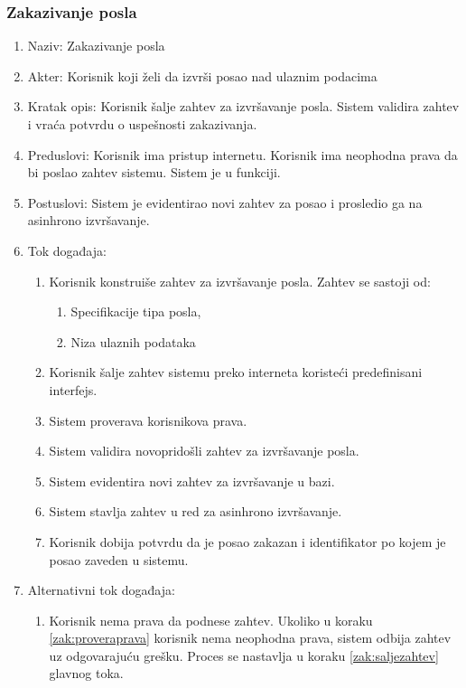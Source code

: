 \documentclass[12pt,oneside]{memoir}
\begin{document}
\subsubsection{Zakazivanje posla}
\begin{enumerate}
\item Naziv: Zakazivanje posla
\item Akter: Korisnik koji želi da izvrši posao nad ulaznim podacima
\item Kratak opis: Korisnik šalje zahtev za izvršavanje posla. Sistem validira zahtev i vraća potvrdu o uspešnosti zakazivanja.
\item Preduslovi: Korisnik ima pristup internetu. Korisnik ima neophodna prava da bi poslao zahtev sistemu. Sistem je u funkciji.
\item Postuslovi: Sistem je evidentirao novi zahtev za posao i prosledio ga na asinhrono izvršavanje.
\item Tok događaja:
	\begin{enumerate}
	\item \label{zak:konstruisezahtev}Korisnik konstruiše zahtev za izvršavanje posla. Zahtev se sastoji od:
		\begin{enumerate}
		\item Specifikacije tipa posla,
		\item Niza ulaznih podataka
		\end{enumerate}
	\item \label{zak:saljezahtev} Korisnik šalje zahtev sistemu preko interneta koristeći predefinisani interfejs.
	\item \label{zak:proveraprava} Sistem proverava korisnikova prava.
	\item \label{zak:validacijazahteva} Sistem validira novopridošli zahtev za izvršavanje posla.
	\item Sistem evidentira novi zahtev za izvršavanje u bazi.
	\item \label{zak:asinhzakazivanje} Sistem stavlja zahtev u red za asinhrono izvršavanje.
	\item Korisnik dobija potvrdu da je posao zakazan i identifikator po kojem je posao zaveden u sistemu.
	\end{enumerate}
\item Alternativni tok događaja:
	\begin{enumerate}
	\item Korisnik nema prava da podnese zahtev. Ukoliko u koraku \ref{zak:proveraprava} korisnik nema neophodna prava, sistem odbija zahtev uz odgovarajuću grešku. Proces se nastavlja u koraku \ref{zak:saljezahtev} glavnog toka.

\end{enumerate}
\end{enumerate}
\end{document}
